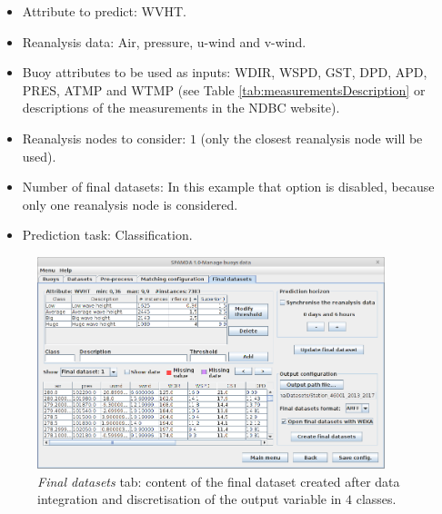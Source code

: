 \documentclass[energies,article,submit,moreauthors,pdftex]{Definitions/mdpi}
\begin{document}
			\begin{itemize}
				\item Attribute to predict: WVHT.
				\item Reanalysis data: Air, pressure, u-wind and v-wind.
				\item Buoy attributes to be used as inputs: WDIR, WSPD, GST, DPD, APD, PRES, ATMP and WTMP (see Table \ref{tab:measurementsDescription} or descriptions of the measurements in the NDBC website).
				\item Reanalysis nodes to consider: $1$ (only the closest reanalysis node will be used).
				\item Number of final datasets: In this example that option is disabled, because only one reanalysis node is considered.
				\item Prediction task: Classification.
			\end{itemize} 
			
			\begin{figure}[ht!]
				\centering
				\includegraphics[width=0.90\textwidth]{figures/FigureFinal_datasets.png}
				\caption{\textit{Final datasets} tab: content of the final dataset created after data integration and discretisation of the output variable in $4$ classes.}\label{fig:final_dataset}
			\end{figure}
			
\end{document}
